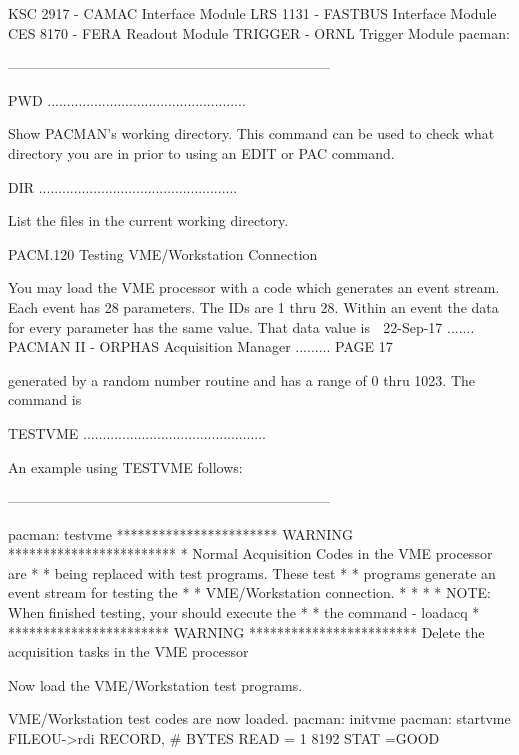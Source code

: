    KSC 2917 -  CAMAC Interface Module
   LRS 1131 -  FASTBUS Interface Module
   CES 8170 -  FERA Readout Module
   TRIGGER  -  ORNL Trigger Module
   pacman:
 
     ---------------------------------------------------------------------
 
 
   PWD ...................................................
 
   Show  PACMAN's  working  directory.  This command can be used to check what
   directory you are in prior to using an EDIT or PAC command.
 
   DIR ...................................................
 
   List the files in the current working directory.
 
   PACM.120 Testing VME/Workstation Connection
 
   You may load the VME  processor  with  a  code  which  generates  an  event
   stream.   Each  event has 28 parameters.  The IDs are 1 thru 28.  Within an
   event the data for every parameter has the same value.  That data  value is
    
   22-Sep-17 ....... PACMAN II - ORPHAS Acquisition Manager ......... PAGE  17
 
   generated  by  a  random number routine and has a range of 0 thru 1023. The
   command is
 
   TESTVME ...............................................
 
   An example using TESTVME follows:
 
     ---------------------------------------------------------------------
 
   pacman: testvme
   *********************** WARNING ************************
   *  Normal Acquisition Codes in the VME processor are   *
   *  being replaced with test programs.  These test      *
   *  programs generate an event stream for testing the   *
   *  VME/Workstation connection.                          *
   *                                                      *
   * NOTE: When finished testing, your should execute the *
   *       the command - loadacq                          *
   *********************** WARNING ************************
   Delete the acquisition tasks in the VME processor
 
   Now load the VME/Workstation test programs.
 
   VME/Workstation test codes are now loaded.
   pacman: initvme
   pacman: startvme
   FILEOU->rdi
   RECORD, # BYTES READ =       1    8192    STAT =GOOD
 
